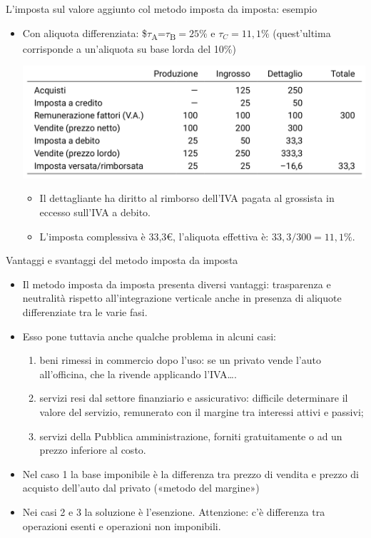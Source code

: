 \documentclass[11pt,italian]{beamer}
\begin{document}
\begin{frame}{L'imposta sul valore aggiunto col metodo imposta da imposta: esempio}
\begin{itemize}
\item Con aliquota differenziata: \$$\tau$\textsubscript{A}=$\tau$\textsubscript{B}$=25\%$ e $\tau_C=11,1\%$
(quest'ultima corrisponde a un'aliquota su base lorda del 10\%)
\begin{center}
\includegraphics[width=\textwidth]{./figure/esempio-imposta-da-imposta-2.png}
\end{center}
\begin{itemize}
\item Il dettagliante ha diritto al rimborso dell'IVA pagata al grossista in
eccesso sull'IVA a debito.
\item L'imposta complessiva è 33,3€, l'aliquota effettiva è: $33,3/300=11,1\%$.
\end{itemize}
\end{itemize}
\end{frame}

\begin{frame}{Vantaggi e svantaggi del metodo imposta da imposta}
\begin{itemize}
\item Il metodo imposta da imposta presenta diversi vantaggi: trasparenza e
neutralità rispetto all'integrazione verticale anche in presenza di aliquote
differenziate tra le varie fasi.
\item Esso pone tuttavia anche qualche problema in alcuni casi:
\begin{enumerate}
\item \alert{beni rimessi in commercio dopo l'uso}: se un privato vende l'auto
all'officina, che la rivende applicando l'IVA\ldots{}.
\item \alert{servizi resi dal settore finanziario e assicurativo}: difficile
determinare il valore del servizio, remunerato con il margine tra
interessi attivi e passivi;
\item \alert{servizi della Pubblica amministrazione}, forniti gratuitamente o ad un
prezzo inferiore al costo.
\end{enumerate}
\item Nel caso 1 la base imponibile è la differenza tra prezzo di vendita e prezzo
di acquisto dell'auto dal privato («metodo del margine»)
\item Nei casi 2 e 3 la soluzione è l'\alert{esenzione}. Attenzione: c'è differenza tra
operazioni esenti e operazioni non imponibili.
\end{itemize}
\end{frame}
\end{document}
